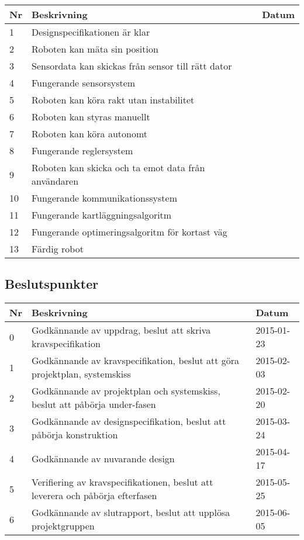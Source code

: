 \documentclass[11pt]{article}
\begin{document}
\begin{flushleft}
\begin{table}[h]
\begin{tabular}{|l|p{.75\linewidth}|l|}
Nr &
Beskrivning &
Datum \\ \hline

1 &
Designspecifikationen är klar &
 \\ \hline
2 &
Roboten kan mäta sin position &
 \\ \hline
3 &
Sensordata kan skickas från sensor till rätt dator &
 \\ \hline
4 &
Fungerande sensorsystem &
 \\ \hline
5 &
Roboten kan köra rakt utan instabilitet &
 \\ \hline
6 &
Roboten kan styras manuellt &
 \\ \hline
7 &
Roboten kan köra autonomt &
 \\ \hline
8 &
Fungerande reglersystem &
 \\ \hline
9 &
Roboten kan skicka och ta emot data från användaren &
 \\ \hline
10 &
Fungerande kommunikationssystem &
 \\ \hline
11 &
Fungerande kartläggningsalgoritm &
 \\ \hline
12 &
Fungerande optimeringsalgoritm för kortast väg &
 \\ \hline
13 &
Färdig robot &
 \\ \hline
 
\end{tabular}
\end{table}

\subsection{Beslutspunkter}
\begin{table}[h]
\begin{tabular}{|l|p{.75\linewidth}|l|} \hline

Nr &
Beskrivning &
Datum \\ \hline

0 &
Godkännande av uppdrag, beslut att skriva kravspecifikation &
2015-01-23 \\ \hline
1 &
Godkännande av kravspecifikation, beslut att göra projektplan, systemskiss &
2015-02-03 \\ \hline
2 &
Godkännande av projektplan och systemskiss, beslut att påbörja under-fasen &
2015-02-20 \\ \hline
3 &
Godkännande av designspecifikation, beslut att påbörja konstruktion &
2015-03-24 \\ \hline
4 &
Godkännande av nuvarande design &
2015-04-17 \\ \hline
5 &
Verifiering av kravspecifikationen, beslut att leverera och påbörja efterfasen &
2015-05-25 \\ \hline
6 &
Godkännande av slutrapport, beslut att upplösa projektgruppen &
2015-06-05 \\ \hline
 

\end{tabular}
\end{table}
\end{flushleft}
\end{document}
